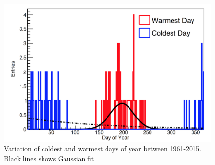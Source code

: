 \begin{figure}
    \centering
    \includegraphics{0001.png}
    \caption{Variation of coldest and warmest days of year between 1961-2015. Black lines shows Gaussian fit}
\end{figure}
